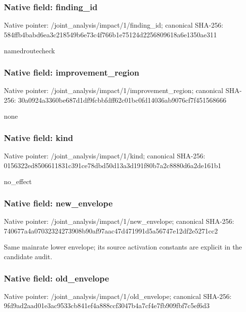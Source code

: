 \documentclass[10pt,a4paper]{article}
\begin{document}
\subsubsection{Native field: finding\_id}


Native pointer: /joint\_analysis/impact/1/finding\_id; canonical SHA-256: 584ffb4babd6ea3c218549b6\allowbreak{}e73c4f766b1e75124d225680\allowbreak{}9618a6e1350ae311


namedroutecheck


\subsubsection{Native field: improvement\_region}


Native pointer: /joint\_analysis/impact/1\allowbreak{}/improvement\_region; canonical SHA-256: 30a0924a3360be687d1df9fc\allowbreak{}bbfdff62c01bc0fd14036ab9\allowbreak{}076cf7f451568666


none


\subsubsection{Native field: kind}


Native pointer: /joint\_analysis/impact/1/kind; canonical SHA-256: 0156322ed8506611831c391c\allowbreak{}e78dbd50d13a3d191f80b7a2\allowbreak{}c8880d6a2de161b1


no\_effect


\subsubsection{Native field: new\_envelope}


Native pointer: /joint\_analysis/impact/1/new\_envelope; canonical SHA-256: 740677a4a07032324273908b\allowbreak{}90af97aac47d471991d5a567\allowbreak{}47e12df2e5271cc2


Same mainrate lower envelope; its source activation constants are explicit in the candidate audit.


\subsubsection{Native field: old\_envelope}


Native pointer: /joint\_analysis/impact/1/old\_envelope; canonical SHA-256: 9fd9ad2aad01e3ac9533cb84\allowbreak{}1ef4a888ccf3047b4a7cf4e7\allowbreak{}fb909fbf7c5ef6d3
\end{document}
